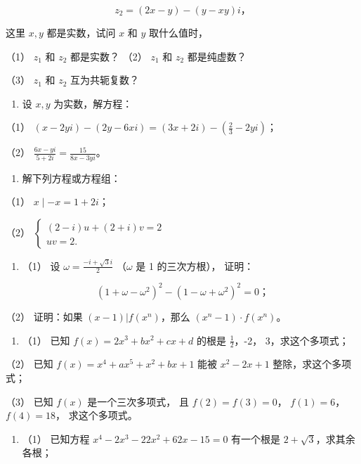 \[
z _ {2} = (2 x - y) - (y - x y) i\text{，}
\]

这里 \(x, y\) 都是实数，试问 \(x\) 和 \(y\) 取什么值时，

（1） \(z_{1}\) 和 \(z_{2}\) 都是实数？ （2） \(z_{1}\) 和 \(z_{2}\)
都是纯虚数？

（3） \(z_{1}\) 和 \(z_{2}\) 互为共轭复数？

\begin{enumerate}[start=15]
\item
  设 \(x, y\) 为实数，解方程：
\end{enumerate}

（1）
\((x - 2yi) - (2y - 6xi) = (3x + 2i) - \left(\frac{2}{3} - 2yi\right)\)；

（2） \(\frac{6x - yi}{5 + 2i} = \frac{15}{8x - 3yi}\)。

\begin{enumerate}[start=16]
\item
  解下列方程或方程组：
\end{enumerate}

（1） \(x \mid -x = 1 + 2i\)；

（2）
\(\left\{ \begin{array}{l} (2 - i)u + (2 + i)v = 2 \\ uv = 2. \end{array} \right.\)

\begin{enumerate}[start=17]
\item
  （1） 设 \(\omega = \frac{-i + \sqrt{3}i}{2}\) （\(\omega\) 是 1
  的三次方根）， 证明：
\end{enumerate}

\[
(1 + \omega - \omega^ {2}) ^ {2} - (1 - \omega + \omega^ {2}) ^ {2} = 0\text{；}
\]

（2） 证明：如果 \((x - 1)|f(x^n)\)，那么 \((x^n - 1) \cdot f(x^n)\)。

\begin{enumerate}[start=18]
\item
  （1） 已知 \(f(x) = 2x^3 + bx^2 + cx + d\) 的根是
  \(\frac{1}{2}\)，-2， 3，求这个多项式；
\end{enumerate}

（2） 已知 \(f(x) = x^4 + ax^5 + x^2 + bx + 1\) 能被 \(x^2 - 2x + 1\)
整除，求这个多项式；

（3） 已知 \(f(x)\) 是一个三次多项式， 且 \(f(2) = f(3) = 0\)，
\(f(1) = 6\)， \(f(4) = 18\)， 求这个多项式。

\begin{enumerate}[start=19]
\item
  （1） 已知方程 \(x^4 - 2x^3 - 22x^2 + 62x - 15 = 0\) 有一个根是
  \(2 + \sqrt{3}\)，求其余各根；
\end{enumerate}

